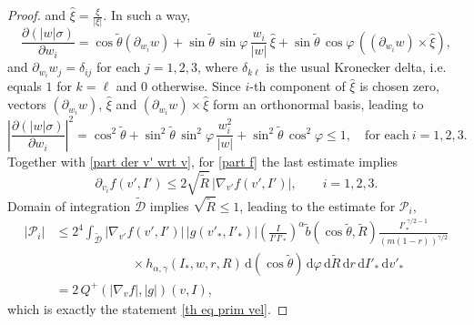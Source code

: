 \documentclass[11pt,a4paper]{amsart}
\newcommand{\md}{\mathrm{d}}
\newcommand{\g}{\gamma}
\newcommand{\Dt}{\tilde{\mathcal{D}}}
\newcommand{\hag}{h_{\alpha,\g}}
\newcommand{\Prim}{\mathcal{P}}
\begin{document}
\begin{proof}
and $\hat{\xi} = \frac{ {\xi}}{| {\xi}|}$. 
 In such a way,
\begin{equation*}
	\frac{\partial \left( |w|	\sigma\right)}{\partial w_i} = \cos\tilde{\theta} \left( \partial_{w_i} w \right) + \sin\tilde{\theta} \, \sin\varphi \, \frac{w_i}{|w|} \, \hat{\xi} +  \sin\tilde{\theta} \, \cos\varphi \,\left( \left( \partial_{w_i} w \right)  \times  \hat{\xi} \right),
\end{equation*}
and $ \partial_{w_i} w_j = \delta_{ij}$ for each $j=1,2,3$,  where $\delta_{k\ell}$ is the usual Kronecker delta, i.e. equals $1$ for $k=\ell$ and 0 otherwise. Since $i$-th component of $\hat{\xi}$  is chosen zero, vectors $\left( \partial_{w_i} w \right)$, $\hat{\xi}$ and $\left( \partial_{w_i} w \right)  \times  \hat{\xi} $ form an orthonormal basis, leading to 
\begin{equation*}
	\left| 	\frac{\partial \left( |w|	\sigma\right)}{\partial w_i}  \right|^2 =   \cos^2\tilde{\theta} + \sin^2\tilde{\theta} \, \sin^2\varphi \, \frac{w_i^2}{|w|}   +  \sin^2\tilde{\theta} \, \cos^2\varphi \leq 1, \quad \text{for each} \ i=1,2,3.
\end{equation*}
Together with   \eqref{part der v' wrt v}, for \eqref{part f} the last estimate implies 
\begin{equation*}
	\partial_{v_i}  f(v',I')  \leq 2 \sqrt{\tilde{R}} \, \left| \nabla_{v'} f(v',I') \right|, \qquad i=1,2,3.
\end{equation*}
Domain of integration $\Dt$ implies $ \sqrt{\tilde{R}} \leq 1$, leading to the estimate for $\Prim_i$,
	\begin{equation}\label{T1 bound} 
		\begin{split}
 	\left|\Prim_i\right|  &\leq 2^4\int_{	\Dt} \left| \nabla_{v'}  f(v',I') \right| \, \left|g(v'_*,I'_*)\right| \left(\frac{I }{I' I'_* }\right)^{\alpha}  \tilde{b}(\cos\tilde{\theta},\tilde{R})    \frac{I'^{\,\g/2-1}_*}{(m(1-r))^{\g/2}} \\ & \qquad\qquad\qquad \times   \hag(I_*, w, r, R)  \, 	\md (\cos\tilde{\theta}) \, \md \varphi \, \md \tilde{R} \, \md r \, \md I'_* \, \md v'_*
 	\\
 	&= 2  \, Q^+\left( \left| \nabla_{v}  f \right|,  \left| g \right|  \right)(v,I),
 	\end{split}
\end{equation}
which is exactly the statement \eqref{th eq prim vel}.

\end{proof}
\end{document}
